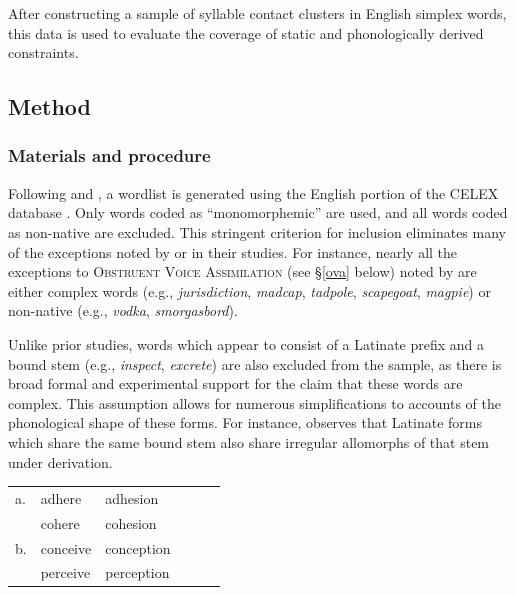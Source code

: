 After constructing a sample of syllable contact clusters in English simplex words, this data is used to evaluate the coverage of static and phonologically derived constraints.

\subsection{Method}

\subsubsection{Materials and procedure}

Following \citet[ chap.~8]{Duanmu2009} and \citet[ chap.~3]{Hammond1999a}, 
a wordlist is generated using the English portion of the CELEX database \citep{CELEX}. 
Only words coded as ``monomorphemic'' are used, and all words coded as non-native are excluded.
This stringent criterion for inclusion eliminates many of the exceptions noted by \citeauthor{Duanmu2009} or \citeauthor{Hammond1999a} in their studies. For instance, nearly all the exceptions to \textsc{Obstruent Voice Assimilation} (see \S\ref{ova} below) noted by \citet[74]{Hammond1999a} are 
either complex words (e.g., \emph{jurisdiction}, \emph{madcap}, \emph{tadpole}, \emph{scapegoat}, \emph{magpie}) or non-native (e.g., \emph{vodka}, \emph{smorgasbord}).

Unlike prior studies, words which appear to consist of a Latinate prefix and a bound stem (e.g., \emph{inspect}, \emph{excrete}) are also excluded from the sample, as there is broad formal and experimental support for the claim that these words are complex.
This assumption allows for numerous simplifications to accounts of the phonological shape of these forms. 
For instance, \citet[11f.]{Aronoff1976} observes that Latinate forms which share the same bound stem also share irregular allomorphs of that stem under derivation. 

\begin{example}
\begin{tabular}{l l l l l l}
a. & {adhere}   & {adhesion}   \\
   & {cohere}   & {cohesion}   \\
b. & {conceive} & {conception} \\
   & {perceive} & {perception} \\
\end{tabular}
\end{example}

